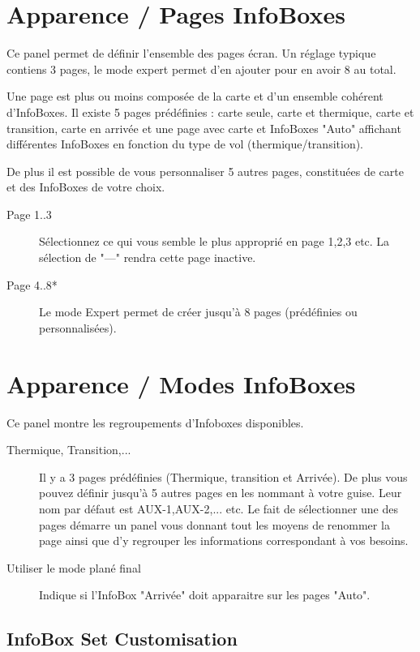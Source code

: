 \section{Apparence / Pages InfoBoxes}

Ce panel permet de définir l'ensemble des pages écran. Un réglage typique contiens 3 pages, le mode expert permet d'en ajouter pour en avoir 8 au total.

Une page est plus ou moins composée de la carte et d'un ensemble cohérent d'InfoBoxes.  Il existe 5 pages prédéfinies : carte seule, carte et thermique, carte et transition, carte en arrivée et une page avec carte et InfoBoxes "Auto" affichant différentes InfoBoxes en fonction du type de vol (thermique/transition).

De plus il est possible de vous personnaliser 5 autres pages, constituées de carte et des InfoBoxes de votre choix. 

\begin{description}
\item[Page 1..3]  Sélectionnez ce qui vous semble le plus approprié en page 1,2,3 etc. La sélection de "---" rendra cette page inactive.
\item[Page 4..8*] Le mode Expert permet de créer jusqu'à 8 pages (prédéfinies ou personnalisées).
\end{description}


\section{Apparence / Modes InfoBoxes}\label{sec:infobox_sets}

Ce panel montre les regroupements d'Infoboxes disponibles.

\begin{description}
\item[Thermique, Transition,...]  Il y a 3 pages prédéfinies (Thermique, transition et Arrivée). De plus vous pouvez définir jusqu'à 5 autres pages en les nommant à votre guise. Leur nom par défaut est AUX-1,AUX-2,... etc.
Le fait de sélectionner une des pages démarre un panel vous donnant tout les moyens de renommer la page ainsi que d'y regrouper les informations correspondant à vos besoins.
\item[Utiliser le mode plané final]  Indique si l'InfoBox "Arrivée" doit apparaitre sur les pages "Auto".
\end{description}


\subsection*{InfoBox Set Customisation}

